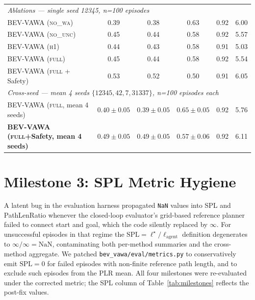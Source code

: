 \documentclass[11pt,a4paper]{article}
\begin{document}
\begin{table}[t]
\begin{tabular}{lccccc}
\midrule
\multicolumn{6}{l}{\emph{Ablations --- single seed 12345, n=100 episodes}} \\
BEV-VAWA (\textsc{no\_wa})              & 0.39 & 0.38 & 0.63 & 0.92 & 6.00 \\
BEV-VAWA (\textsc{no\_unc})             & 0.45 & 0.44 & 0.58 & 0.92 & 5.57 \\
BEV-VAWA (\textsc{h1})                  & 0.44 & 0.43 & 0.58 & 0.91 & 5.03 \\
BEV-VAWA (\textsc{full})                & 0.45 & 0.44 & 0.58 & 0.92 & 5.54 \\
BEV-VAWA (\textsc{full} + Safety)       & 0.53 & 0.52 & 0.50 & 0.91 & 6.05 \\
\midrule
\multicolumn{6}{l}{\emph{Cross-seed --- mean 4 seeds $\{12345,42,7,31337\}$, n=100 episodes each}} \\
BEV-VAWA (\textsc{full}, mean 4 seeds)  & $0.40\pm 0.05$ & $0.39\pm 0.05$ & $0.65\pm 0.05$ & 0.92 & 5.76 \\
\textbf{BEV-VAWA (\textsc{full}+Safety, mean 4 seeds)} & $\mathbf{0.49\pm 0.05}$ & $\mathbf{0.49\pm 0.05}$ & $\mathbf{0.57\pm 0.06}$ & 0.92 & 6.11 \\
\bottomrule
\end{tabular}
\end{table}

\section{Milestone 3: SPL Metric Hygiene}\label{sec:spl}

A latent bug in the evaluation harness propagated \texttt{NaN} values
into SPL and PathLenRatio whenever the closed-loop evaluator's
grid-based reference planner failed to connect start and goal, which
the code silently replaced by $\infty$. For unsuccessful episodes in
that regime the $\mathrm{SPL}=\ell^{\star}/\ell_{\text{agent}}$
definition \citep{AndersonOnEvaluation2018} degenerates to
$\infty/\infty=\text{NaN}$, contaminating both per-method summaries
and the cross-method aggregate. We patched
\texttt{bev\_vawa/eval/metrics.py} to conservatively emit $\mathrm{SPL}
=0$ for failed episodes with non-finite reference path length, and
to exclude such episodes from the PLR mean. All four milestones were
re-evaluated under the corrected metric; the SPL column of
Table~\ref{tab:milestones} reflects the post-fix values.

\end{document}
